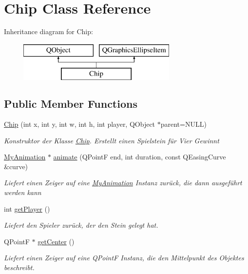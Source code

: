 \hypertarget{class_chip}{\section{Chip Class Reference}
\label{class_chip}
}
Inheritance diagram for Chip\-:\begin{figure}[H]
\begin{center}
\leavevmode
\includegraphics[height=2.000000cm]{class_chip}
\end{center}
\end{figure}
\subsection*{Public Member Functions}
\begin{DoxyCompactItemize}
\item 
\hyperlink{class_chip_a50f4a36e13f90a93d0a7ed1360bfe92a}{Chip} (int x, int y, int w, int h, int player, Q\-Object $\ast$parent=N\-U\-L\-L)
\begin{DoxyCompactList}\small\item\em Konstruktor der Klasse \hyperlink{class_chip}{Chip}. Erstellt einen Spielstein für Vier Gewinnt \end{DoxyCompactList}\item 
\hyperlink{class_my_animation}{My\-Animation} $\ast$ \hyperlink{class_chip_abb087aff174edd3145895b24f735eb29}{animate} (Q\-Point\-F end, int duration, const Q\-Easing\-Curve \&curve)
\begin{DoxyCompactList}\small\item\em Liefert einen Zeiger auf eine \hyperlink{class_my_animation}{My\-Animation} Instanz zurück, die dann ausgeführt werden kann \end{DoxyCompactList}\item 
int \hyperlink{class_chip_acbf29a18e6349c52878dca3600461af5}{get\-Player} ()
\begin{DoxyCompactList}\small\item\em Liefert den Spieler zurück, der den Stein gelegt hat. \end{DoxyCompactList}\item 
Q\-Point\-F $\ast$ \hyperlink{class_chip_a558787f04d66e87353cf8bebefae1f2d}{get\-Center} ()
\begin{DoxyCompactList}\small\item\em Liefert einen Zeiger auf eine Q\-Point\-F Instanz, die den Mittelpunkt des Objektes beschreibt. \end{DoxyCompactList}\end{DoxyCompactItemize}
